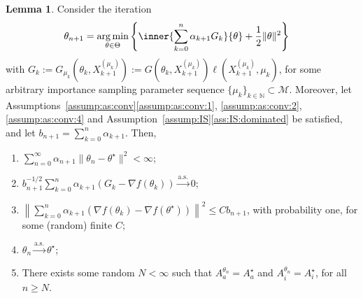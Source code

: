 \documentclass[11pt,a4paper]{article}
\theoremstyle{definition}
\newtheorem{lemma}[theorem]{Lemma}
\DeclareMathOperator*{\argmin}{arg\,min}
\newcommand{\defn}{:=}
\begin{document}
\begin{lemma}
\label{lemma:as:conv:theta}
Consider the iteration
\begin{align}
\label{eq:NDA:theta}
    \theta_{n+1} &= \argmin_{\theta \in \Theta} \left\{ \inner{\sum_{k=0}^n \alpha_{k+1} G_k}{\theta} +\frac{1}{2} \| \theta\|^2\right\}
\end{align}
with $G_k\defn G_{\mu_k}(\theta_k, X_{k+1}^{(\mu_k)}) \defn G(\theta_k, X_{k+1}^{(\mu_k)})\ell(X_{k+1}^{(\mu_k)},\mu_k)$, for some arbitrary importance sampling parameter sequence $\{\mu_k\}_{k\in\mathbb N} \subset \mathcal M$. Moreover, let Assumptions~\ref{assump:as:conv}\ref{assump:as:conv:1}, \ref{assump:as:conv:2}, \ref{assump:as:conv:4} and Assumption~\ref{assump:IS}\ref{ass:IS:dominated} be satisfied, and let $b_{n+1} = \sum_{k=0}^n \alpha_{k+1}$. Then, 
\begin{enumerate}[label=(\roman*)]
    \item \label{lemma:as:conv:theta:1} $\sum_{n=0}^\infty \alpha_{n+1}\|\theta_n - \theta^\star\|^2 < \infty$;
    
    \item \label{lemma:as:conv:theta:2} $b_{n+1}^{-1/2}\sum_{k=0}^n \alpha_{k+1}(G_k - \nabla f(\theta_k)) \overset{\text{a.s.}}{\to} 0$;

    \item \label{lemma:as:conv:theta:3} $\left\|\sum_{k=0}^n \alpha_{k+1} (\nabla f(\theta_k) - \nabla f(\theta^\star))  \right\|^2 \leq C b_{n+1}$, with probability one, for some (random) finite $C$;

    \item \label{lemma:as:conv:theta:4} $\theta_n \overset{\text{a.s.}}{\to} \theta^\star$;

    \item \label{lemma:as:conv:theta:5} There exists some random $N < \infty$ such that $A_{a}^{\theta_n} = A_{a}^\star$ and $A_{i}^{\theta_n} = A_{i}^\star$, for all $n \geq N$.
\end{enumerate}
\end{lemma}
\end{document}

